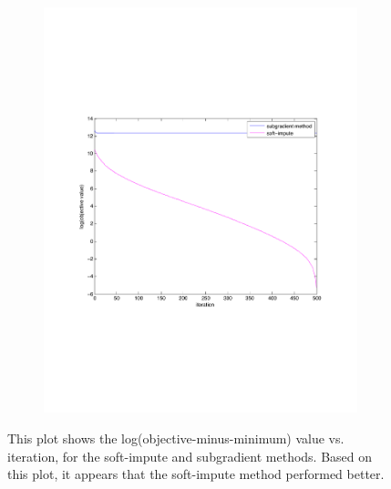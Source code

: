 \begin{figure}[h!tbp]
\begin{subfigure}[a]{0.6\textwidth}
        \includegraphics[width=\textwidth]{img/p3_05.pdf}
    \end{subfigure}
    \caption{This plot shows the log(objective-minus-minimum) value vs. iteration, for the
    soft-impute and subgradient methods. Based on this plot, it appears that
    the soft-impute method performed better.} 
\end{figure}


